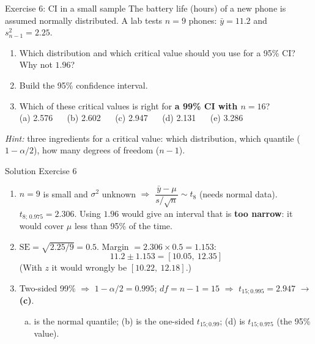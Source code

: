 \documentclass[
  11pt,
  ignorenonframetext,
  aspectratio=169,
]{beamer}
\providecommand{\tightlist}{%
  \setlength{\itemsep}{0pt}\setlength{\parskip}{0pt}}
\newcommand{\se}{\mathrm{SE}}
\begin{document}
\begin{frame}{Exercise 6: CI in a small sample}
\protect{}\label{exercise-6-ci-in-a-small-sample}
The battery life (hours) of a new phone is assumed normally distributed.
A lab tests \(n=9\) phones: \(\bar y=11.2\) and \(s^2_{n-1}=2.25\).

\begin{enumerate}
\tightlist
\item
  Which distribution and which critical value should you use for a 95\%
  CI? Why not \(1.96\)?
\item
  Build the 95\% confidence interval.
\item
  Which of these critical values is right for \textbf{a 99\% CI with
  \(n=16\)}? \\ 
  (a) 2.576 \(\quad\) (b) 2.602 \(\quad\) (c) 2.947
  \(\quad\) (d) 2.131 \(\quad\) (e) 3.286
\end{enumerate}

\emph{Hint:} three ingredients for a critical value: which distribution,
which quantile (\(1-\alpha/2\)), how many degrees of freedom (\(n-1\)).
\end{frame}

\begin{frame}{Solution Exercise 6}
\protect{}\label{solution-exercise-6}
\begin{enumerate}
\item
  \(n=9\) is small and \(\sigma^2\) unknown \(\Rightarrow\)
  \(\dfrac{\bar y-\mu}{s/\sqrt n}\sim t_{8}\) (needs normal data).
  \(t_{8;\,0.975}=\mathbf{2.306}\). Using \(1.96\) would give an
  interval that is \textbf{too narrow}: it would cover \(\mu\) less than
  95\% of the time.
\item
  \(\se=\sqrt{2.25/9}=0.5\). Margin \(=2.306\times0.5=1.153\):
  \[11.2\pm1.153=\mathbf{[10.05,\ 12.35]}\] (With \(z\) it would wrongly
  be \([10.22,\ 12.18]\).)
\item
  Two-sided 99\% \(\Rightarrow\) \(1-\alpha/2=0.995\); \(df=n-1=15\)
  \(\Rightarrow\) \(t_{15;0.995}=\mathbf{2.947}\) \(\to\) \textbf{(c)}.

  \begin{enumerate}
  [(a)]
  \tightlist
  \item
    is the normal quantile; (b) is the one-sided \(t_{15;0.99}\); (d) is
    \(t_{15;0.975}\) (the 95\% value).
  \end{enumerate}
\end{enumerate}
\end{frame}
\end{document}

